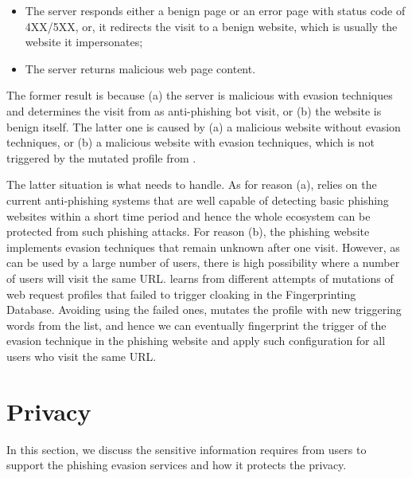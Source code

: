 \begin{itemize}
    \item The server responds either a benign page or an error page with status code of 4XX/5XX, or, it redirects the visit to a benign website, which is usually the website it impersonates;
    \item The server returns malicious web page content.
\end{itemize}


The former result is because (a) the server is malicious with evasion techniques and determines the visit from \spartacus as anti-phishing bot visit, or (b) the website is benign itself.
The latter one is caused by (a) a malicious website without evasion techniques, or (b) a malicious website with evasion techniques, which is not triggered by the mutated profile from \spartacus.

The latter situation is what \spartacus needs to handle.
As for reason (a), \spartacus relies on the current anti-phishing systems that are well capable of detecting basic phishing websites within a short time period and hence the whole ecosystem can be protected from such phishing attacks.
For reason (b), the phishing website implements evasion techniques that remain unknown after one visit.
However, as \spartacus can be used by a large number of users, there is high possibility where a number of users will visit the same URL.
\spartacus learns from different attempts of mutations of web request profiles that failed to trigger cloaking in the Fingerprinting Database.
Avoiding using the failed ones, \spartacus mutates the profile with new triggering words from the list, and hence we can eventually fingerprint the trigger of the evasion technique in the phishing website and apply such configuration for all \spartacus users who visit the same URL.






\section{Privacy}

In this section, we discuss the sensitive information \spartacus requires from users to support the phishing evasion services and how it protects the privacy.

